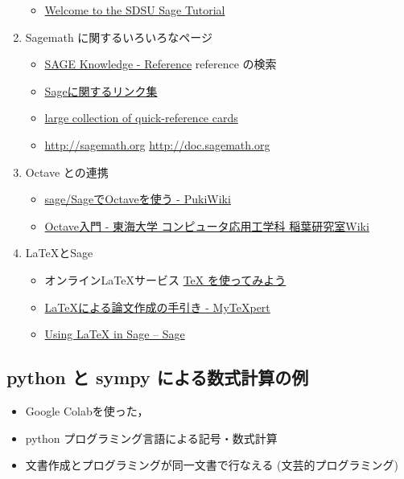 \documentclass[dvipdfmx,11pat]{jarticle}
\begin{document}
\begin{enumerate}
\begin{itemize}
\item \href{http://mosullivan.sdsu.edu/Teaching/sdsu-sage-tutorial/index.html}{Welcome to the SDSU Sage Tutorial}
\end{itemize}
\item Sagemath に関するいろいろなページ
\label{sec:org4121477}
\begin{itemize}
\item \href{http://sk.sagepub.com/reference}{SAGE Knowledge - Reference} reference の検索
\item \href{https://qiita.com/HirofumiYashima/items/6bb5770961a3b7d33118}{Sageに関するリンク集}
\item \href{http://wiki.sagemath.org/quickref}{large collection of quick-reference cards}
\item \url{http://sagemath.org} \url{http://doc.sagemath.org}
\end{itemize}
\item Octave との連携
\label{sec:org363e4f6}
\begin{itemize}
\item \href{http://www.pwv.co.jp/\%7Etake/TakeWiki/index.php?sage\%2FSage\%E3\%81\%A7Octave\%E3\%82\%92\%E4\%BD\%BF\%E3\%81\%86}{sage/SageでOctaveを使う - PukiWiki}
\item \href{http://www.inaba-lab.org/wiki/index.php/Octave\%E5\%85\%A5\%E9\%96\%80}{Octave入門 - 東海大学 コンピュータ応用工学科 稲葉研究室Wiki}
\end{itemize}
\item \LaTeX{}とSage
\label{sec:orgf2d030f}
\begin{itemize}
\item オンライン\LaTeX{}サービス  \href{https://oku.edu.mie-u.ac.jp/\~okumura/texonweb/}{\TeX{} を使ってみよう}
\item \href{https://mytexpert.osdn.jp/index.php?LaTeX\%A4\%CB\%A4\%E8\%A4\%EB\%CF\%C0\%CA\%B8\%BA\%EE\%C0\%AE\%A4\%CE\%BC\%EA\%B0\%FA\%A4\%AD}{\LaTeX{}による論文作成の手引き - MyTeXpert}
\item \href{http://sage.math.gordon.edu/home/pub/51/}{Using \LaTeX{} in Sage -- Sage}
\end{itemize}
\end{enumerate}
\subsection{python と sympy による数式計算の例}
\label{sec:orgd13946a}



\begin{itemize}
\item Google Colabを使った，
\item python プログラミング言語による記号・数式計算
\item 文書作成とプログラミングが同一文書で行なえる (文芸的プログラミング)
\end{itemize}
\end{document}
